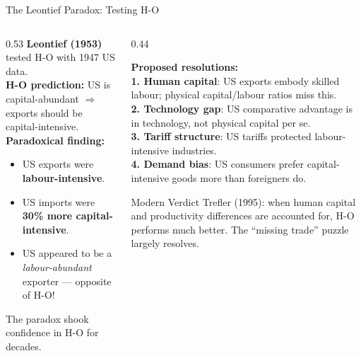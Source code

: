 \documentclass[aspectratio=169]{beamer}
\begin{document}

\begin{frame}[shrink=15]{The Leontief Paradox: Testing H-O}
\begin{columns}[T]
\begin{column}{0.53\textwidth}
\textbf{Leontief (1953)} tested H-O with 1947 US data.\\[0.2em]
\textbf{H-O prediction:} US is capital-abundant $\Rightarrow$
exports should be capital-intensive.\\[0.2em]
\textbf{Paradoxical finding:}
\begin{itemize}\small
  \item US exports were \textbf{labour-intensive}.
  \item US imports were \textbf{30\% more capital-intensive}.
  \item US appeared to be a \emph{labour-abundant}
        exporter --- opposite of H-O!
\end{itemize}
\vspace{0.2em}
\small The paradox shook confidence in H-O for decades.
\end{column}
\begin{column}{0.44\textwidth}
\begin{varbox}
\small\textbf{Proposed resolutions:}\\[0.3em]
\textbf{1. Human capital}: US exports embody
skilled labour; physical capital/labour ratios
miss this.\\[0.2em]
\textbf{2. Technology gap}: US comparative advantage
is in technology, not physical capital per se.\\[0.2em]
\textbf{3. Tariff structure}: US tariffs protected
labour-intensive industries.\\[0.2em]
\textbf{4. Demand bias}: US consumers prefer
capital-intensive goods more than foreigners do.
\end{varbox}
\vspace{0.3em}
\begin{insight}{Modern Verdict}
\small Trefler (1995): when human capital and
productivity differences are accounted for,
H-O performs much better. The ``missing trade''
puzzle largely resolves.
\end{insight}
\end{column}
\end{columns}
\end{frame}
\end{document}
